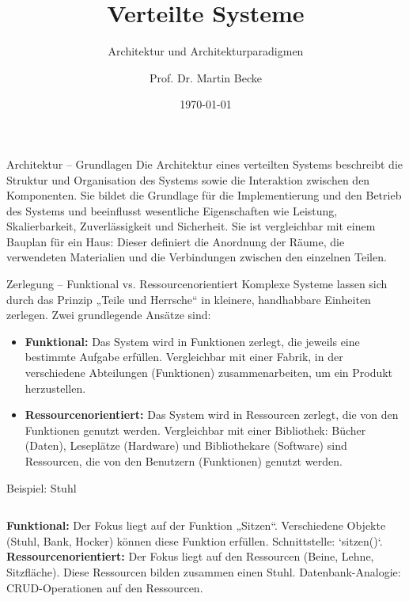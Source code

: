 \documentclass{beamer}
\title{Verteilte Systeme}
\subtitle{Architektur und Architekturparadigmen}
\author{Prof. Dr. Martin Becke}
\date{\today}
\begin{document}
\begin{frame}
    \titlepage
\end{frame}

\begin{frame}{Architektur -- Grundlagen}
    Die Architektur eines verteilten Systems beschreibt die Struktur und Organisation des Systems sowie die Interaktion zwischen den Komponenten. Sie bildet die Grundlage für die Implementierung und den Betrieb des Systems und beeinflusst wesentliche Eigenschaften wie Leistung, Skalierbarkeit, Zuverlässigkeit und Sicherheit. 
    \newline \newline
    Sie ist vergleichbar mit einem Bauplan für ein Haus: Dieser definiert die Anordnung der Räume, die verwendeten Materialien und die Verbindungen zwischen den einzelnen Teilen.
\end{frame}

\begin{frame}{Zerlegung -- Funktional vs. Ressourcenorientiert}
    Komplexe Systeme lassen sich durch das Prinzip „Teile und Herrsche“ in kleinere, handhabbare Einheiten zerlegen. Zwei grundlegende Ansätze sind:
    \begin{itemize}
        \item \textbf{Funktional:} Das System wird in Funktionen zerlegt, die jeweils eine bestimmte Aufgabe erfüllen. Vergleichbar mit einer Fabrik, in der verschiedene Abteilungen (Funktionen) zusammenarbeiten, um ein Produkt herzustellen.
        \item \textbf{Ressourcenorientiert:} Das System wird in Ressourcen zerlegt, die von den Funktionen genutzt werden. Vergleichbar mit einer Bibliothek: Bücher (Daten), Leseplätze (Hardware) und Bibliothekare (Software) sind Ressourcen, die von den Benutzern (Funktionen) genutzt werden.
    \end{itemize}
\end{frame}

\begin{frame}{Beispiel: Stuhl}
    \begin{columns}
        \textbf{Funktional:} Der Fokus liegt auf der Funktion „Sitzen“. Verschiedene Objekte (Stuhl, Bank, Hocker) können diese Funktion erfüllen. \newline Schnittstelle: `sitzen()`.
        \textbf{Ressourcenorientiert:} Der Fokus liegt auf den Ressourcen (Beine, Lehne, Sitzfläche). Diese Ressourcen bilden zusammen einen Stuhl. \newline Datenbank-Analogie: CRUD-Operationen auf den Ressourcen.
    \end{columns}
\end{frame}
\end{document}
